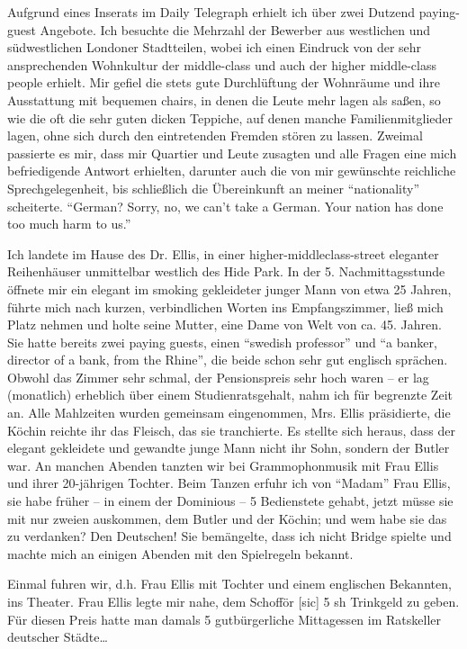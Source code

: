 Aufgrund eines Inserats im Daily Telegraph erhielt ich über zwei Dutzend paying-guest Angebote. Ich besuchte die Mehrzahl der Bewerber aus westlichen und südwestlichen Londoner Stadtteilen, wobei ich einen Eindruck von der sehr ansprechenden Wohnkultur der middle-class und auch der higher middle-class people erhielt. Mir gefiel die stets gute Durchlüftung der Wohnräume und ihre Ausstattung mit bequemen chairs, in denen die Leute mehr lagen als saßen, so wie die oft die sehr guten dicken Teppiche, auf denen manche Familienmitglieder lagen, ohne sich durch den  eintretenden Fremden stören zu lassen. Zweimal passierte es mir, dass mir Quartier und Leute zusagten und alle Fragen eine mich befriedigende Antwort erhielten, darunter auch die von mir gewünschte reichliche Sprechgelegenheit, bis schließlich die Übereinkunft an meiner \enquote{nationality} scheiterte. \enquote{German? Sorry, no, we can't take a German. Your nation has done too much harm to us.}

Ich landete im Hause des Dr. Ellis, in einer higher-middleclass-street eleganter Reihenhäuser unmittelbar westlich des Hide Park. In der 5. Nachmittagsstunde öffnete mir ein elegant im smoking gekleideter junger Mann von etwa 25 Jahren, führte mich nach kurzen, verbindlichen Worten ins Empfangszimmer, ließ mich Platz nehmen und holte seine Mutter, eine Dame von Welt von ca. 45. Jahren. Sie hatte bereits zwei paying guests, einen \enquote{swedish professor} und \enquote{a banker, director of a bank, from the Rhine}, die beide schon sehr gut englisch sprächen. Obwohl das Zimmer sehr schmal, der Pensionspreis sehr hoch waren -- er lag (monatlich) erheblich über einem Studienratsgehalt, nahm ich für begrenzte Zeit an. Alle Mahlzeiten wurden gemeinsam eingenommen, Mrs. Ellis präsidierte, die Köchin reichte ihr das Fleisch, das sie tranchierte. Es stellte sich heraus, dass der elegant gekleidete und gewandte junge Mann nicht ihr Sohn, sondern der Butler war. An manchen Abenden tanzten wir bei Grammophonmusik mit Frau Ellis und ihrer 20-jährigen Tochter. Beim Tanzen erfuhr ich von \enquote{Madam} Frau Ellis, sie habe früher -- in einem der Dominious -- 5 Bedienstete gehabt, jetzt müsse sie mit nur zweien auskommen, dem Butler und der Köchin; und wem habe sie das zu verdanken? Den Deutschen! Sie bemängelte, dass ich nicht Bridge spielte und machte mich an einigen Abenden mit den Spielregeln bekannt.

Einmal fuhren wir, d.h. Frau Ellis mit Tochter und einem englischen Bekannten, ins Theater. Frau Ellis legte mir nahe, dem Schofför [sic] 5 sh Trinkgeld zu geben. Für diesen Preis hatte man damals 5 gutbürgerliche Mittagessen im Ratskeller deutscher Städte\dots

